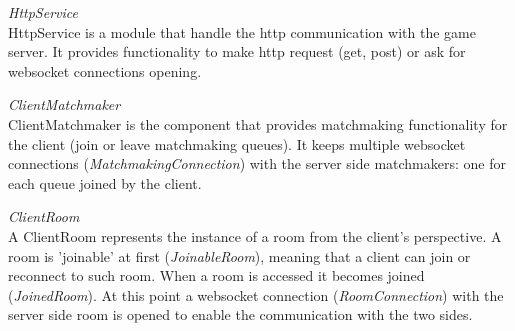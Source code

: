 \bigskip
\textit{HttpService}
\\
HttpService is a module that handle the http communication with the game server. It provides functionality to make http request (get, post) or ask for websocket connections opening. 

\bigskip
\textit{ClientMatchmaker}
\\
 ClientMatchmaker is the component that provides matchmaking functionality for the client (join or leave matchmaking queues). It keeps multiple websocket connections (\textit{MatchmakingConnection}) with the server side matchmakers: one for each queue joined by the client. 

\bigskip
\textit{ClientRoom}
\\
A ClientRoom represents the instance of a room from the client's perspective. A room is 'joinable' at first  (\textit{JoinableRoom}), meaning that a client can join or reconnect to such room. 
When a room is accessed it becomes joined (\textit{JoinedRoom}). At this point a websocket connection (\textit{RoomConnection}) with the server side room is opened to enable the communication with the two sides.


